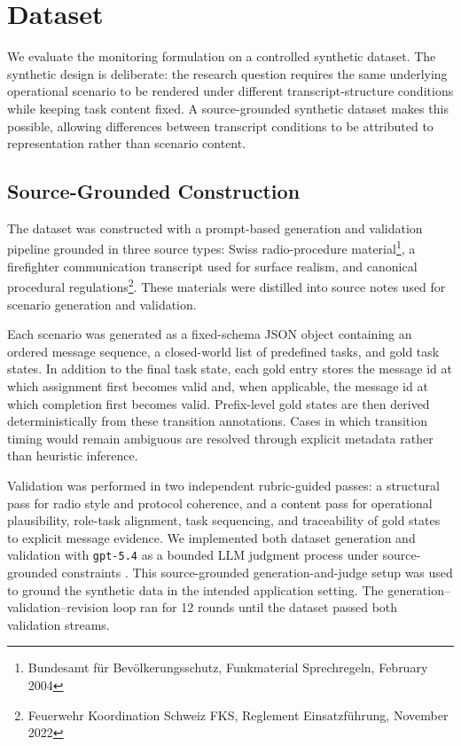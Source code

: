 \section{Dataset}
\label{sec:dataset}

We evaluate the monitoring formulation on a controlled synthetic dataset. The synthetic design is deliberate: the research question requires the same underlying operational scenario to be rendered under different transcript-structure conditions while keeping task content fixed. A source-grounded synthetic dataset makes this possible, allowing differences between transcript conditions to be attributed to representation rather than scenario content.

\subsection{Source-Grounded Construction}

The dataset was constructed with a prompt-based generation and validation pipeline grounded in three source types: Swiss radio-procedure material\footnote{Bundesamt für Bevölkerungsschutz, Funkmaterial Sprechregeln, February 2004}, a firefighter communication transcript used for surface realism, and canonical procedural regulations\footnote{Feuerwehr Koordination Schweiz FKS, Reglement Einsatzführung, November 2022}. These materials were distilled into source notes used for scenario generation and validation.

Each scenario was generated as a fixed-schema JSON object containing an ordered message sequence, a closed-world list of predefined tasks, and gold task states. In addition to the final task state, each gold entry stores the message id at which assignment first becomes valid and, when applicable, the message id at which completion first becomes valid. Prefix-level gold states are then derived deterministically from these transition annotations. Cases in which transition timing would remain ambiguous are resolved through explicit metadata rather than heuristic inference.

Validation was performed in two independent rubric-guided passes: a structural pass for radio style and protocol coherence, and a content pass for operational plausibility, role-task alignment, task sequencing, and traceability of gold states to explicit message evidence. We implemented both dataset generation and validation with \texttt{gpt-5.4} as a bounded LLM judgment process under source-grounded constraints \citep{Zheng2023,Rotteger2024SafetyPrompts}. This source-grounded generation-and-judge setup was used to ground the synthetic data in the intended application setting. The generation--validation--revision loop ran for 12 rounds until the dataset passed both validation streams.

